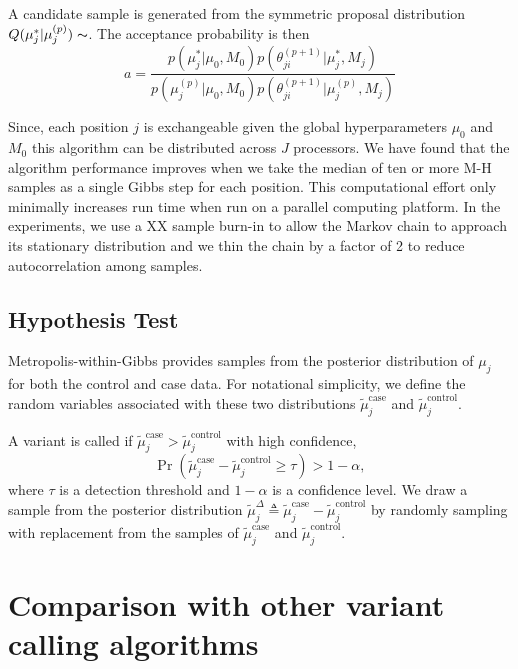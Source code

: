 \documentclass[11pt,reqno]{amsart}
\begin{document}
A candidate sample is generated from the symmetric proposal distribution $Q(\mu_j^* | \mu_j^{(p)}) \thicksim $. The acceptance probability is then
\begin{equation}
	a = \frac{ p(\mu_j^* | \mu_0, M_0) p(\theta^{(p+1)}_{ji} | \mu_j^*, M_j) } {p(\mu_j^{(p)} | \mu_0, M_0) p(\theta^{(p+1)}_{ji} | \mu_j^{(p)}, M_j)}
\end{equation}

Since, each position $j$ is exchangeable given the global hyperparameters $\mu_0$ and $M_0$ this algorithm can be distributed across $J$ processors. We have found that the algorithm performance improves when we take the median of ten or more M-H samples as a single Gibbs step for each position. This computational effort only minimally increases run time when run on a parallel computing platform. In the experiments, we use a XX sample burn-in to allow the Markov chain to approach its stationary distribution and we thin the chain by a factor of 2 to reduce autocorrelation among samples.

\subsection{Hypothesis Test}
Metropolis-within-Gibbs provides samples from the posterior distribution of $\mu_j$ for both the control and case data. For notational simplicity, we define the random variables associated with these two distributions $\tilde{\mu}_j^{\text{case}}$ and $\tilde{\mu}_j^{\text{control}}$.

A variant is called if $\tilde{\mu}_j^{\text{case}} > \tilde{\mu}_j^{\text{control}}$ with high confidence,
\begin{equation}
	\Pr( \tilde{\mu}_j^{\text{case}} - \tilde{\mu}_j^{\text{control}} \geq \tau ) > 1-\alpha,
\end{equation}
where $\tau$ is a detection threshold and $1-\alpha$ is a confidence level. We draw a sample from the posterior distribution $\tilde{\mu}_j^{\Delta} \triangleq \tilde{\mu}_j^{\text{case}} - \tilde{\mu}_j^{\text{control}}$ by randomly sampling with replacement from the samples of $\tilde{\mu}_j^{\text{case}}$ and $\tilde{\mu}_j^{\text{control}}$.

\section{Comparison with other variant calling algorithms}
\end{document}

